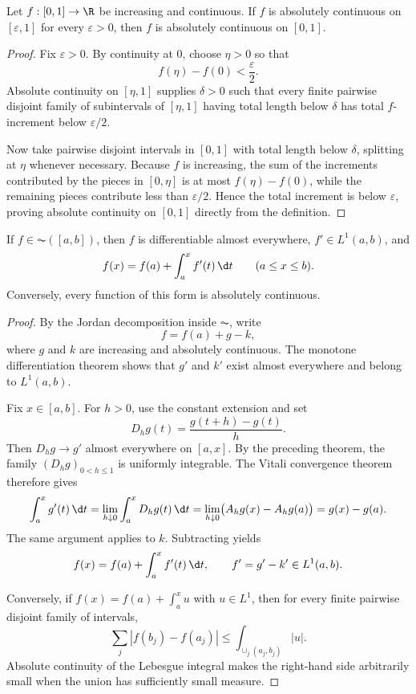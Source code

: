 \begin{prop}
Let $f:[0,1]\to\R$ be increasing and continuous. If $f$ is absolutely continuous on $[\varepsilon,1]$ for every $\varepsilon>0$, then $f$ is absolutely continuous on $[0,1]$.
\end{prop}

\begin{proof}
Fix $\varepsilon>0$. By continuity at $0$, choose $\eta>0$ so that
\[
f(\eta)-f(0)<\frac{\varepsilon}{2}.
\]
Absolute continuity on $[\eta,1]$ supplies $\delta>0$ such that every finite pairwise disjoint family of subintervals of $[\eta,1]$ having total length below $\delta$ has total $f$-increment below $\varepsilon/2$.

Now take pairwise disjoint intervals in $[0,1]$ with total length below $\delta$, splitting at $\eta$ whenever necessary. Because $f$ is increasing, the sum of the increments contributed by the pieces in $[0,\eta]$ is at most $f(\eta)-f(0)$, while the remaining pieces contribute less than $\varepsilon/2$. Hence the total increment is below $\varepsilon$, proving absolute continuity on $[0,1]$ directly from the definition.
\end{proof}

\begin{thm}
If $f\in\AC([a,b])$, then $f$ is differentiable almost everywhere, $f'\in L^1(a,b)$, and
\[
f(x)=f(a)+\int_a^x f'(t)\,\d t
\qquad(a\leq x\leq b).
\]
Conversely, every function of this form is absolutely continuous.
\end{thm}

\begin{proof}
By the Jordan decomposition inside $\AC$, write
\[
f=f(a)+g-k,
\]
where $g$ and $k$ are increasing and absolutely continuous. The monotone differentiation theorem shows that $g'$ and $k'$ exist almost everywhere and belong to $L^1(a,b)$.

Fix $x\in[a,b]$. For $h>0$, use the constant extension and set
\[
D_hg(t)=\frac{g(t+h)-g(t)}h.
\]
Then $D_hg\to g'$ almost everywhere on $[a,x]$. By the preceding theorem, the family $(D_hg)_{0<h\leq1}$ is uniformly integrable. The Vitali convergence theorem therefore gives
\[
\int_a^x g'(t)\,\d t
 =\lim_{h\downarrow0}\int_a^xD_hg(t)\,\d t
 =\lim_{h\downarrow0}\bigl(A_hg(x)-A_hg(a)\bigr)
 =g(x)-g(a).
\]
The same argument applies to $k$. Subtracting yields
\[
f(x)=f(a)+\int_a^xf'(t)\,\d t,
\qquad f'=g'-k'\in L^1(a,b).
\]

Conversely, if $f(x)=f(a)+\int_a^x u$ with $u\in L^1$, then for every finite pairwise disjoint family of intervals,
\[
\sum_j|f(b_j)-f(a_j)|
\leq\int_{\cup_j(a_j,b_j)}|u|.
\]
Absolute continuity of the Lebesgue integral makes the right-hand side arbitrarily small when the union has sufficiently small measure.
\end{proof}

